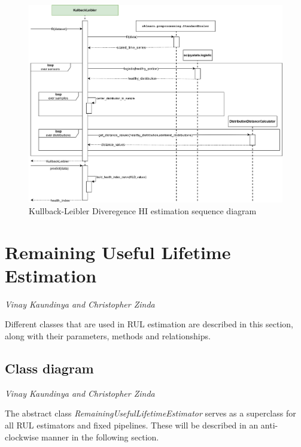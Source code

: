 \begin{figure}[H]
    \centering
    \includegraphics[width=\textwidth]{gfx/Kullbacksequencediagram.png}
    \caption{Kullback-Leibler Diveregence HI estimation sequence diagram}
    \label{fig:sequence_KLD}
\end{figure}

\section{Remaining Useful Lifetime Estimation}
\vspace*{-6.5mm}\hfill{\normalsize\emph{Vinay Kaundinya and Christopher Zinda}}

Different classes that are used in RUL estimation are described in this section, along with their parameters, methods and relationships.

\subsection*{Class diagram}
\vspace*{-12.5mm}\hfill{\normalsize\emph{Vinay Kaundinya and Christopher Zinda}}

The abstract class \textit{RemainingUsefulLifetimeEstimator} serves as a superclass for all RUL estimators and fixed pipelines. These will be described in an anti-clockwise manner in the following section.


